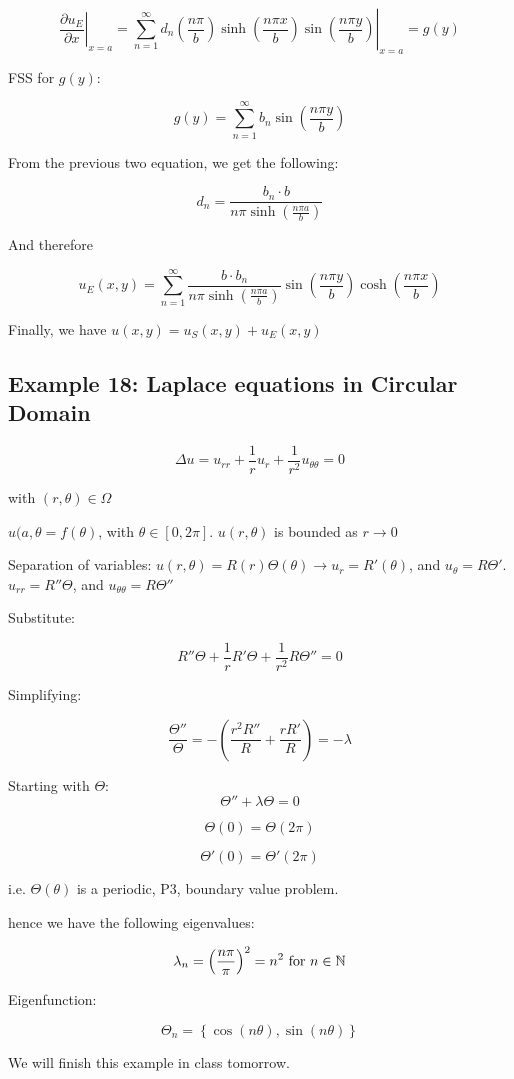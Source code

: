 \documentclass{article}
\begin{document}
$$\left. \frac{\partial u_E}{\partial x} \right|_{x=a} = \left. \sum_{n=1}^\infty d_n \left( \frac{n \pi}{b} \right) \sinh \left( \frac{n \pi x}{b} \right) \sin \left( \frac{n \pi y}{b} \right) \right|_{x=a} = g(y)$$

FSS for $g(y)$:

$$g(y) = \sum_{n=1}^\infty b_n \sin \left( \frac{n \pi y}{b} \right)$$

From the previous two equation, we get the following:

$$d_n = \frac{ b_n \cdot b}{n \pi \sinh \left( \frac{n \pi a}{b} \right) }$$




And therefore

$$u_E (x,y) = \sum_{n=1}^\infty \frac{b \cdot b_n}{n \pi \sinh ( \frac{n \pi a}{b} )} \sin \left( \frac{n \pi y}{b} \right) \cosh \left( \frac{n \pi x}{b} \right)$$

Finally, we have $u(x,y) = u_S (x,y) + u_E(x,y)$

\subsection{Example 18: Laplace equations in Circular Domain}

$$\Delta u = u_{rr} + \frac{1}{r} u_r + \frac{1}{r^2} u_{\theta \theta} = 0$$

with $(r, \theta) \in \Omega$

$u(a,\theta = f(\theta)$, with $\theta \in [0, 2 \pi]$. $u(r, \theta)$ is bounded as $r \to 0$

Separation of variables: $u(r, \theta) = R(r) \Theta (\theta) \to u_r = R' (\theta)$, and $u_{\theta} = R \Theta '$. $u_{rr} = R'' \Theta$, and $u_{\theta \theta} = R \Theta''$

Substitute:

$$R'' \Theta + \frac{1}{r} R' \Theta + \frac{1}{r^2} R \Theta'' = 0$$

Simplifying:

$$\frac{\Theta ''}{\Theta} = - \left( \frac{r^2 R''}{R} + \frac{r R'}{R} \right) = - \lambda$$

Starting with $\Theta$:
$$\Theta'' + \lambda \Theta = 0$$

$$\Theta(0) = \Theta (2 \pi)$$

$$\Theta'(0) = \Theta'( 2 \pi)$$

i.e. $\Theta (\theta)$ is a periodic, P3, boundary value problem. 

hence we have the following eigenvalues:

$$\lambda_n = \left( \frac{n \pi}{\pi} \right)^2 = n^2 \text{ for } n \in \mathbb{N}$$

Eigenfunction:


$$\Theta_n = \left\{ \cos(n \theta), \sin(n \theta) \right\}$$

We will finish this example in class tomorrow. 
\end{document}

